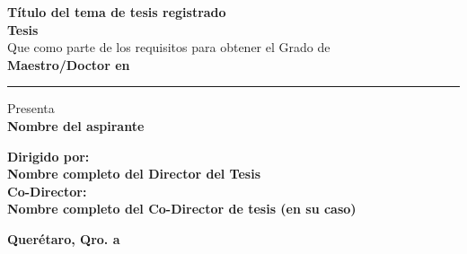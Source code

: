 \begin{minipage}[H][\textheight][c]{0.8\textwidth}
\begin{tcolorbox}[colframe=black, colback=white, rounded corners, boxrule=0.5mm, width=\linewidth, height=\textheight, valign=center]
            \vspace{2cm}
            
            \begin{center}
                {\Large \textbf{Título del tema de tesis registrado}} \\
                \vspace{1cm}
                {\Large \textbf{Tesis}} \\
                \vspace{0.5cm}
                {\large Que como parte de los requisitos para obtener el Grado de} \\
                \vspace{0.5cm}
                {\large \textbf{Maestro/Doctor en}} \\
                \vspace{1cm}
                \hrule height 0.4mm width 9cm
                \vspace{1cm}
                {\large Presenta} \\
                \vspace{0.5cm}
                {\Large \textbf{Nombre del aspirante}} \\
            \end{center}
            
            \vspace{2cm}
            
            \begin{flushleft}
                \textbf{Dirigido por:} \\
                \textbf{Nombre completo del Director del Tesis} \\
                \vspace{0.5cm}
                \textbf{Co-Director:} \\
                \textbf{Nombre completo del Co-Director de tesis (en su caso)} \\
            \end{flushleft}
            
            \vfill
            
            \begin{flushright}
                \textbf{Querétaro, Qro. a \underline{\hspace{3cm}}} \\
            \end{flushright}
            
            \vspace{1cm}
        \end{tcolorbox}
    \end{minipage}


